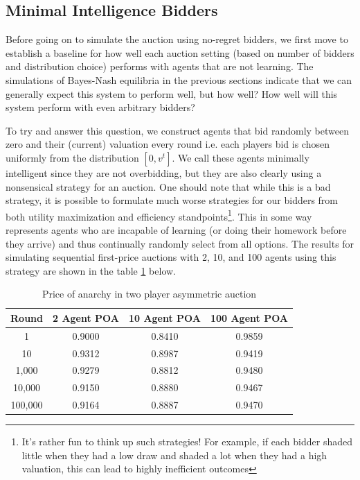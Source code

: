 \documentclass[12pt,twoside]{reedthesis}
\begin{document}
\subsection{Minimal Intelligence Bidders}
Before going on to simulate the auction using no-regret bidders, we first move to establish a baseline for how well each auction setting (based on number of bidders and distribution choice) performs with agents that are not learning. The simulations of Bayes-Nash equilibria in the previous sections indicate that we can generally expect this system to perform well, but how well? How well will this system perform with even arbitrary bidders?
 
To try and answer this question, we construct agents that bid randomly between zero and their (current) valuation every round i.e. each players bid is chosen uniformly from the distribution $[0,v^t]$. We call these agents minimally intelligent since they are not overbidding, but they are also clearly using a nonsensical strategy for an auction. One should note that while this is a bad strategy, it is possible to formulate much worse strategies for our bidders from both utility maximization and efficiency standpoints\footnote{It's rather fun to think up such strategies! For example, if each bidder shaded little when they had a low draw and shaded a lot when they had a high valuation, this can lead to highly inefficient outcomes}. This in some way represents agents who are incapable of learning (or doing their homework before they arrive) and thus continually randomly select from all options. The results for simulating sequential first-price auctions with 2, 10, and 100 agents using this strategy are shown in the table \ref{table:zero_int_symmetric} below.

\begin{table}[h!]
	\begin{center}
		\begin{tabular}{ |c|c|c|c| }
			\hline
			Round & 2 Agent POA & 10 Agent POA & 100 Agent POA \\
			\hline
			1 & 0.9000 & 0.8410 & 0.9859\\
			10 & 0.9312 & 0.8987 & 0.9419\\
			1,000 & 0.9279 & 0.8812 & 0.9480\\
			10,000 & 0.9150 & 0.8880 & 0.9467\\
			100,000 & 0.9164 & 0.8887 & 0.9470\\
			\hline
		\end{tabular}
		\caption{Price of anarchy in two player asymmetric auction}
		\label{table:zero_int_symmetric}
	\end{center} 
\end{table}
\end{document}
